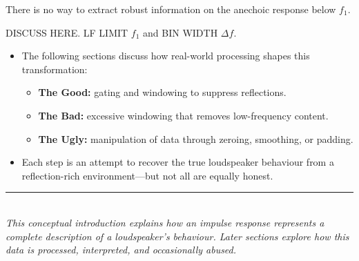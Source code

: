 \documentclass[12pt,a4paper]{article}
\begin{document}
There is no way to extract robust information on the anechoic response below $f_1$.


DISCUSS HERE. LF LIMIT $f_1$ and BIN WIDTH $\Delta f$.





\begin{itemize}[noitemsep]
    \item The following sections discuss how real-world processing shapes this transformation:
    \begin{itemize}
        \item \textbf{The Good:} gating and windowing to suppress reflections.
        \item \textbf{The Bad:} excessive windowing that removes low-frequency content.
        \item \textbf{The Ugly:} manipulation of data through zeroing, smoothing, or padding.
    \end{itemize}
    \item Each step is an attempt to recover the true loudspeaker behaviour from a reflection-rich environment—but not all are equally honest.
\end{itemize}

\vspace{1em}
\noindent\rule{\textwidth}{0.4pt}\\
\textit{This conceptual introduction explains how an impulse response represents a complete description of a loudspeaker’s behaviour. Later sections explore how this data is processed, interpreted, and occasionally abused.}
\end{document}
